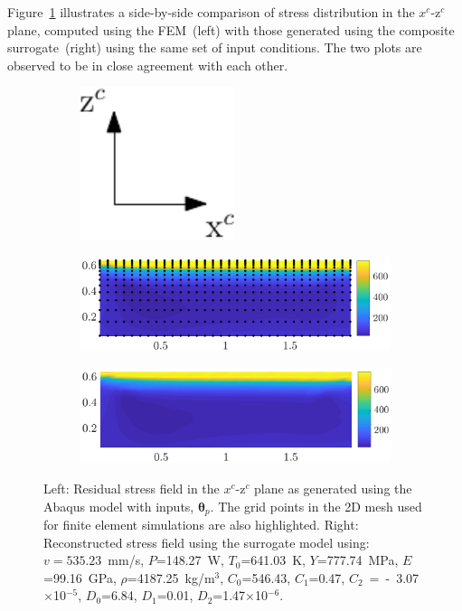 Figure~\ref{fig:RS_comp} illustrates a side-by-side comparison of stress distribution in the $x^c$-z$^c$ plane,
computed using the FEM~(left) with those generated using the composite surrogate~(right) using the same
set of input conditions. The two plots
are observed to be in close agreement with each other.  
%
\begin{figure}[htbp]
\begin{center}
\begin{subfigure}{0.15\textwidth}
\vspace{10mm}
\includegraphics[width=0.5\textwidth]{./Figures/xczc} 
\end{subfigure}
\hspace{-1.5cm}
\begin{subfigure}{0.35\textwidth}
\includegraphics[width=1.0\textwidth]{./Figures/origZ_sam13} 
\end{subfigure}
\hspace{0.25cm}
\begin{subfigure}{0.35\textwidth}
\includegraphics[width=1.0\textwidth]{./Figures/recZ_sam13} 
\end{subfigure}
\end{center}
\caption{Left: Residual stress field in the $x^c$-z$^c$ plane as generated using the Abaqus model with inputs, 
$\bm{\theta}_p$. The grid points in the 2D mesh used for finite element simulations are also highlighted. 
Right: Reconstructed stress field using the surrogate model using: $v=535.23$~mm/s, $P$=148.27~W,
$T_0$=641.03~K, $Y$=777.74~MPa, $E$=99.16~GPa, $\rho$=4187.25~kg/m$^3$, $C_0$=546.43, $C_1$=0.47,
$C_2$~=~-~3.07$\times$10$^{-5}$, $D_0$=6.84, $D_1$=0.01, $D_2$=1.47$\times$10$^{-6}$.}
\label{fig:RS_comp}
\end{figure}

